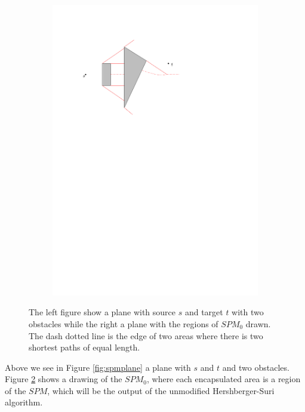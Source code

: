 \begin{figure}[H]
\begin{subfigure}{.5\textwidth}
  \includegraphics[width=.95\linewidth]{figures/spm0.pdf}
  \caption{}
  \label{fig:planewithspm0drawn}
\end{subfigure}
\caption{The left figure show a plane with source $s$ and target $t$ with two obstacles while the 
         right a plane with the regions of $SPM_0$ drawn. The dash dotted line is the edge of two 
  		 areas where there is two shortest paths of equal length.}
\end{figure}

Above we see in Figure \ref{fig:spmplane} a plane with $s$ and $t$ and two obstacles. Figure 
\ref{fig:planewithspm0drawn} shows a drawing of the $SPM_0$, where each encapsulated area is 
a region of the $SPM$, which will be the output of the unmodified Hershberger-Suri algorithm. 

